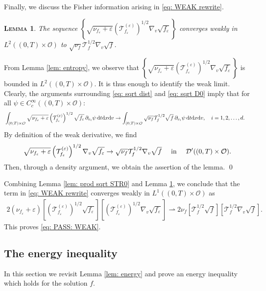 \documentclass[10pt, reqno]{amsart}
\theoremstyle{plain}
\newtheorem{lemma}[theorem]{\normalfont \scshape Lemma}
\theoremstyle{definition}
\theoremstyle{remark}
\renewenvironment{proof}[1][\proofname]{\noindent{\scshape #1.\quad}}{\qed}
\numberwithin{equation}{section}
\newcommand{\calD}{\mathcal D}
\newcommand{\calO}{\mathcal O}
\newcommand{\calT}{\mathcal T}
\newcommand{\p}{\partial}
\newcommand{\ve}{\varepsilon}
\newcommand{\dx}{\textnormal{d}x}
\newcommand{\dv}{\textnormal{d}v}
\newcommand{\dt}{\textnormal{d}t}
\newcommand{\weakto}{\rightharpoonup}
\newcommand{\lt}{\left}
\newcommand{\rt}{\right}
\begin{document}
Finally, we discuss the Fisher information arising in \eqref{eq: WEAK rewrite}.

\begin{lemma} \label{lem: nabla SQRT WEAK}
    The sequence $\lt\{ \sqrt{\nu_{f_\ve}+\ve}\lt(\calT_{f_\ve}^{(\ve)}\rt)^{1/2} \nabla_v \sqrt{f_\ve}\rt\}$ converges weakly in $L^2((0,T)\times \calO)$ to $\sqrt{\nu_f}\calT_f^{1/2} \nabla_v \sqrt{f}$.
\end{lemma}

\begin{proof}
    From Lemma \ref{lem: entropy}, we observe that $\lt\{\sqrt{\nu_{f_\ve}+\ve} \lt(\calT_{f_\ve}^{(\ve)}\rt)^{1/2} \nabla_v \sqrt{f_\ve}\rt\}$ is bounded in $L^2((0,T)\times \calO)$. It is thus enough to identify the weak limit. Clearly, the arguments surrounding \eqref{eq: sqrt dist} and \eqref{eq: sqrt D0} imply that for all $\psi\in C_c^\infty((0,T)\times\calO)$:
    \begin{align*}
        &\int_{(0,T)\times \calO}  \sqrt{\nu_{f_\ve} + \ve}\lt(\calT_{f_\ve}^{(\ve)}\rt)^{1/2} \sqrt{f_\ve} \, \p_{v_i} \psi \,\dt\dx\dv \to \int_{(0,T)\times \calO} \sqrt{\nu_f} \calT_f^{1/2} \sqrt{f} \, \p_{v_i} \psi \,\dt\dx\dv, \quad i=1,2,\ldots, d.
    \end{align*}
    By definition of the weak derivative, we find
    \begin{align*}
        \textnormal{$\sqrt{\nu_{f_\ve}+\ve}\lt(\calT_{f_\ve}^{(\ve)}\rt)^{1/2} \nabla_v \sqrt{f_\ve} \to \sqrt{\nu_f}\calT_f^{1/2} \nabla_v \sqrt{f}$ \quad in \quad $\calD'((0,T)\times \calO)$}.
    \end{align*}
    Then, through a density argument, we obtain the assertion of the lemma.
\end{proof}

Combining Lemma \ref{lem: prod sqrt STR0} and Lemma \ref{lem: nabla SQRT WEAK}, we conclude that the term in \eqref{eq: WEAK rewrite} converges weakly in $L^1((0,T)\times\calO)$ as
\begin{align*}
    2(\nu_{f_\ve} + \ve)  \lt[ \lt(\calT_{f_\ve}^{(\ve)}\rt)^{1/2}\sqrt{f_\ve}\rt] \lt[ \lt(\calT_{f_\ve}^{(\ve)}\rt)^{1/2} \nabla_v \sqrt{f_\ve} \rt] \weakto 2 \nu_f \lt[ \calT_f^{1/2} \sqrt{f} \rt] \lt[ \calT_f^{1/2} \nabla_v \sqrt{f} \rt].
\end{align*}
This proves \eqref{eq: PASS: WEAK}.


%
%
%
%
%
%

\subsection{The energy inequality} \label{sec: energy}
In this section we revisit Lemma \ref{lem: energy} and prove an energy inequality which holds for the solution $f$.
\end{document}
